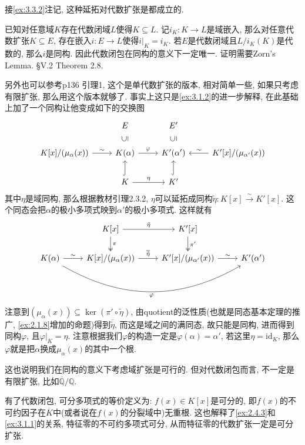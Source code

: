 \begin{remark}
    接\ref{ex:3.3.2}注记, 这种延拓对代数扩张是都成立的. 

    \begin{propstar}
        已知对任意域$K$存在代数闭域$L$使得$K \subseteq L$. 记$i_K:K \to L$是域嵌入, 那么对任意代数扩张$K \subseteq E$, 存在嵌入$i:E \to L$使得$i|_K = i_K$. 若$E$是代数闭域且$L/i_K(K)$是代数的, 那么$i$是同构. 因此代数闭包在同构的意义下一定唯一. 证明需要Zorn's Lemma. \cite{lang2012algebra} \S V.2 Theorem 2.8. 
    \end{propstar}
    另外也可以参考\cite{2009近世代数引论}p136 引理1, 这个是单代数扩张的版本, 相对简单一些, 如果只考虑有限扩张, 那么用这个版本就够了. 事实上这只是\ref{ex:3.1.2}的进一步解释, 在此基础上加了一个同构让他变成如下的交换图
    \[
        \begin{tikzcd}
            & E                                                              & E'                                          &                                               \\
{K[x]/(\mu_\alpha(x))} \arrow[r, "\sim"] & K(\alpha) \arrow[r, "\varphi"] \arrow[u, "\subseteq", phantom, sloped] & K'(\alpha') \arrow[u, "\subseteq", phantom, sloped] & {K'[x]/(\mu_{\alpha'}(x))} \arrow[l, "\sim"'] \\
            & K \arrow[r, "\eta"] \arrow[u, hook]                            & K' \arrow[u, hook]                          &                                              
        \end{tikzcd}
    \]
    其中$\eta$是域同构, 那么根据教材引理2.3.2, $\eta$可以延拓成同构$\tilde{\eta}:K[x] \xrightarrow{\sim} K'[x]$. 这个同态会把$\alpha$的极小多项式映到$\alpha'$的极小多项式. 这样就有
    \[
        \begin{tikzcd}
            & {K[x]} \arrow[d, "\pi", two heads] \arrow[r, "\tilde{\eta}"]       & {K'[x]} \arrow[d, "\pi'", two heads]                 &            \\
K(\alpha) \arrow[r, "\sim"] \arrow[rrr, "\varphi"', bend right] & {K[x]/(\mu_\alpha(x))} \arrow[r, "\overline{\tilde{\eta}}"] & {K'[x]/(\mu_{\alpha'}(x))} \arrow[r, "\sim"] & K'(\alpha')
        \end{tikzcd}
    \]
    注意到$(\mu_\alpha(x)) \subseteq \ker(\pi' \circ \tilde{\eta})$, 由quotient的泛性质(也就是同态基本定理的推广, \ref{ex:2.1.8}增加的命题)得到$\overline{\tilde{\eta}}$, 而这是域之间的满同态, 故只能是同构, 进而得到同构$\varphi$, 且$\varphi|_K = \eta$. 注意根据我们$\varphi$的构造一定是$\varphi(\alpha) = \alpha'$, 若这里$\eta = \mathrm{id}_K$, 那么$\varphi$就是把$\alpha$换成$\mu_\alpha(x)$的其中一个根.

    这也说明我们在同构的意义下考虑域扩张是可行的. 但对代数闭包而言, 不一定是有限扩张, 比如$\overline{\mathbb{Q}}/\mathbb{Q}$.

    有了代数闭包, 可分多项式的等价定义为: $f(x) \in K[x]$是可分的, 即$f(x)$的不可约因子在$\overline{K}$中(或者说在$f(x)$的分裂域中)无重根. 这也解释了\ref{ex:2.4.3}和\ref{ex:3.1.1}的关系, 特征零的不可约多项式可分, 从而特征零的代数扩张一定是可分扩张.
\end{remark}


